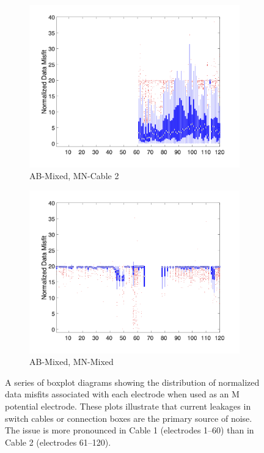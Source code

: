 \documentclass[final,authoryear,5p,times,twocolumn]{elsarticle}
\begin{document}
\begin{figure}[!ht]
   \vspace{1em}

   \begin{subfigure}[b]{0.475\linewidth}
       \centering
       \includegraphics[trim=1.6cm 1.7cm 2cm 1.3cm, clip=true, width=\linewidth]{./Figures/Fig8i.png}
       \caption{AB-Mixed, MN-Cable 2}
       \label{fig:Boxplot_AB_Mixed_MN_Cable2_Misfit_vs_M_ElecID}
   \end{subfigure}
   \hfill
   \begin{subfigure}[b]{0.475\linewidth}
       \centering
       \includegraphics[trim=1.6cm 1.7cm 2cm 1.3cm, clip=true, width=\linewidth]{./Figures/Fig8j.png}
       \caption{AB-Mixed, MN-Mixed}
       \label{fig:Boxplot_AB_Mixed_MN_Mixed_Misfit_vs_M_ElecID}
   \end{subfigure}

   \caption{A series of boxplot diagrams showing the distribution of normalized data misfits associated with each electrode when used as an M potential electrode. These plots illustrate that current leakages in switch cables or connection boxes are the primary source of noise. The issue is more pronounced in Cable 1 (electrodes 1--60) than in Cable 2 (electrodes 61--120).}
   \label{fig:Boxplot_Misfit_vs_M_ElecID}
\end{figure}
\end{document}
